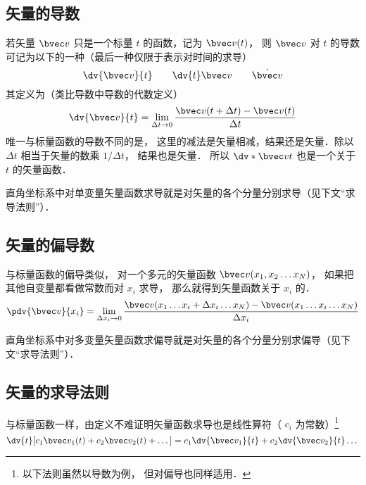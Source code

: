 

\subsection{矢量的导数}

若矢量 $\bvec v$ 只是一个标量 $t$ 的函数，记为 $\bvec v(t)$， 则 $\bvec v$ 对 $t$ 的导数可记为以下的一种（最后一种仅限于表示对时间的求导）
\begin{equation}
\dv{\bvec v}{t} \qquad \dv{t}\bvec v \qquad \dot{\bvec v}
\end{equation}
其定义为（类比导数中导数的代数定义）
\begin{equation}
\dv{\bvec v}{t} = \lim_{\Delta t \to 0} \frac{\bvec v ( t + \Delta t) - \bvec v(t)}{\Delta t}
\end{equation}
唯一与标量函数的导数不同的是， 这里的减法是矢量相减，结果还是矢量．除以 $\Delta t$ 相当于矢量的数乘 $1/\Delta t$， 结果也是矢量． 所以 $\dv*{\bvec v}{t}$ 也是一个关于 $t$ 的矢量函数．

直角坐标系中对单变量矢量函数求导就是对矢量的各个分量分别求导（见下文“求导法则”）．

\subsection{矢量的偏导数}
与标量函数的偏导类似， 对一个多元的矢量函数 $\bvec v(x_1, x_2\ldots x_N)$， 如果把其他自变量都看做常数而对 $x_i$ 求导， 那么就得到矢量函数关于 $x_i$ 的．
\begin{equation}
\pdv{\bvec v}{x_i} = \lim_{\Delta x_i \to 0} \frac{\bvec v(x_1 \ldots x_i+\Delta x_i\ldots x_N) -  \bvec v(x_1 \ldots x_i\ldots x_N)}{\Delta x_i}
\end{equation}

直角坐标系中对多变量矢量函数求偏导就是对矢量的各个分量分别求偏导（见下文“求导法则”）．

\subsection{矢量的求导法则}
与标量函数一样，由定义不难证明矢量函数求导也是线性算符（ $c_i$ 为常数）\footnote{以下法则虽然以导数为例， 但对偏导也同样适用．}
\begin{equation}
\dv{t}[c_1 \bvec v_1(t) + c_2 \bvec v_2(t) + \dots] = c_1\dv{\bvec v_1}{t} + c_2\dv{\bvec v_2}{t} \dots
\end{equation}

